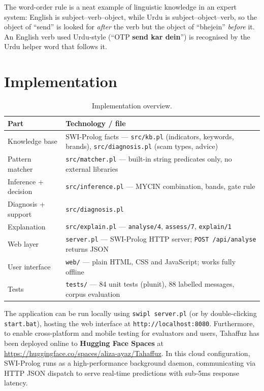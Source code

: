 \documentclass[11pt,a4paper]{article}
\newcommand{\pl}[1]{\texttt{#1}}          %
\begin{document}
\noindent The word-order rule is a neat example of linguistic knowledge in an expert system: English
is subject--verb--object, while Urdu is subject--object--verb, so the object of ``send'' is looked for
\emph{after} the verb but the object of ``bhejein'' \emph{before} it. An English verb used Urdu-style
(``OTP \textbf{send kar dein}'') is recognised by the Urdu helper word that follows it.

\section{Implementation}

\begin{table}[H]
\centering
\small
\begin{tabularx}{\linewidth}{l X}
\toprule
\textbf{Part} & \textbf{Technology / file} \\
\midrule
Knowledge base      & SWI-Prolog facts --- \pl{src/kb.pl} (indicators, keywords, brands), \pl{src/diagnosis.pl} (scam types, advice) \\
Pattern matcher     & \pl{src/matcher.pl} --- built-in string predicates only, no external libraries \\
Inference + decision& \pl{src/inference.pl} --- MYCIN combination, bands, gate rule \\
Diagnosis + support & \pl{src/diagnosis.pl} \\
Explanation         & \pl{src/explain.pl} --- \pl{analyse/4}, \pl{assess/7}, \pl{explain/1} \\
Web layer           & \pl{server.pl} --- SWI-Prolog HTTP server; \texttt{POST /api/analyse} returns JSON \\
User interface      & \pl{web/} --- plain HTML, CSS and JavaScript; works fully offline \\
Tests               & \pl{tests/} --- 84 unit tests (plunit), 88 labelled messages, corpus evaluation \\
\bottomrule
\end{tabularx}
\caption{Implementation overview.}
\end{table}

The application can be run locally using \texttt{swipl server.pl} (or by double-clicking \texttt{start.bat}),
hosting the web interface at \texttt{http://localhost:8080}. Furthermore, to enable cross-platform and mobile
testing for evaluators and users, Tahaffuz has been deployed online to \textbf{Hugging Face Spaces}
at \url{https://huggingface.co/spaces/aliza-ayaz/Tahaffuz}. In this cloud configuration, SWI-Prolog runs
as a high-performance background daemon, communicating via HTTP JSON dispatch to serve real-time predictions
with sub-5ms response latency.
\end{document}
